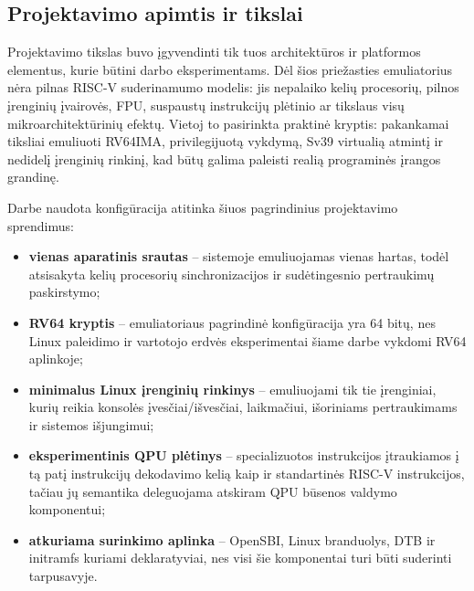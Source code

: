\subsection{Projektavimo apimtis ir tikslai}
\label{sec:projektavimo-apimtis}

Projektavimo tikslas buvo įgyvendinti tik tuos architektūros ir platformos elementus, kurie būtini darbo eksperimentams. Dėl šios priežasties emuliatorius nėra pilnas RISC-V suderinamumo modelis: jis nepalaiko kelių procesorių, pilnos įrenginių įvairovės, FPU, suspaustų instrukcijų plėtinio ar tikslaus visų mikroarchitektūrinių efektų. Vietoj to pasirinkta praktinė kryptis: pakankamai tiksliai emuliuoti RV64IMA, privilegijuotą vykdymą, Sv39 virtualią atmintį ir nedidelį įrenginių rinkinį, kad būtų galima paleisti realią programinės įrangos grandinę.

Darbe naudota konfigūracija atitinka šiuos pagrindinius projektavimo sprendimus:

\begin{itemize}
    \item \textbf{vienas aparatinis srautas} -- sistemoje emuliuojamas vienas hartas, todėl atsisakyta kelių procesorių sinchronizacijos ir sudėtingesnio pertraukimų paskirstymo;
    \item \textbf{RV64 kryptis} -- emuliatoriaus pagrindinė konfigūracija yra 64 bitų, nes Linux paleidimo ir vartotojo erdvės eksperimentai šiame darbe vykdomi RV64 aplinkoje;
    \item \textbf{minimalus Linux įrenginių rinkinys} -- emuliuojami tik tie įrenginiai, kurių reikia konsolės įvesčiai/išvesčiai, laikmačiui, išoriniams pertraukimams ir sistemos išjungimui;
    \item \textbf{eksperimentinis QPU plėtinys} -- specializuotos instrukcijos įtraukiamos į tą patį instrukcijų dekodavimo kelią kaip ir standartinės RISC-V instrukcijos, tačiau jų semantika deleguojama atskiram QPU būsenos valdymo komponentui;
    \item \textbf{atkuriama surinkimo aplinka} -- OpenSBI, Linux branduolys, DTB ir initramfs kuriami deklaratyviai, nes visi šie komponentai turi būti suderinti tarpusavyje.
\end{itemize}
